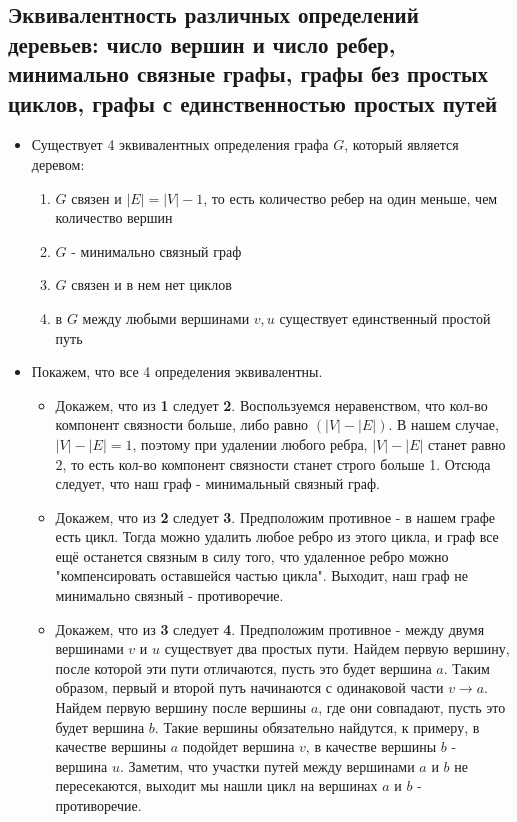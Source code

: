 \subsection{Эквивалентность различных определений деревьев: число вершин и число ребер, минимально связные графы, графы без простых циклов, графы с единственностью простых путей}
\begin{itemize}
    \item
    Существует 4 эквивалентных определения графа $G$, который является деревом:
    \begin{enumerate}
    \item $G$ связен и $|E| = |V| - 1$, то есть количество ребер на один меньше, чем количество вершин
    \item $G$ - минимально связный граф
    \item $G$ связен и в нем нет циклов
    \item в $G$ между любыми вершинами $v, u$ существует единственный простой путь
    \end{enumerate}

    \item Покажем, что все 4 определения эквивалентны.
    \begin{itemize}
    \item
    Докажем, что из \textbf{1} следует \textbf{2}. Воспользуемся неравенством, что кол-во компонент связности больше, либо равно $(|V| - |E|)$. В нашем случае, $|V| - |E| = 1$, поэтому при удалении любого ребра, $|V| - |E|$ станет равно $2$, то есть кол-во компонент связности станет строго больше 1. Отсюда следует, что наш граф - минимальный связный граф.

    \item
    Докажем, что из \textbf{2} следует \textbf{3}. Предположим противное - в нашем графе есть цикл. Тогда можно удалить любое ребро из этого цикла, и граф все ещё останется связным в силу того, что удаленное ребро можно "компенсировать оставшейся частью цикла". Выходит, наш граф не минимально связный - противоречие.

    \item
    Докажем, что из \textbf{3} следует \textbf{4}. Предположим противное - между двумя вершинами $v$ и $u$ существует два простых пути. Найдем первую вершину, после которой эти пути отличаются, пусть это будет вершина $a$. Таким образом, первый и второй путь начинаются с одинаковой части $v \to a$. Найдем первую вершину после вершины $a$, где они совпадают, пусть это будет вершина $b$. Такие вершины обязательно найдутся, к примеру, в качестве вершины $a$ подойдет вершина $v$, в качестве вершины $b$ - вершина $u$. Заметим, что участки путей между вершинами $a$ и $b$ не пересекаются, выходит мы нашли цикл на вершинах $a$ и $b$ - противоречие.


\end{itemize}
\end{itemize}
